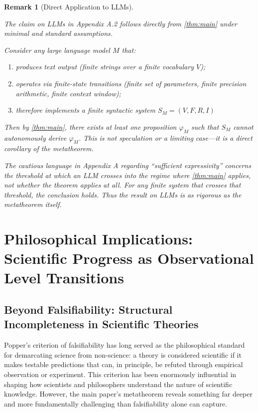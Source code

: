 \documentclass[11pt]{article}
\newtheorem{remark}[theorem]{Remark}
\begin{document}
\begin{remark}[Direct Application to LLMs]
    \label{rem:llm_direct}
    
    The claim on LLMs in Appendix A.2 follows directly from \ref{thm:main} 
    under minimal and standard assumptions. 
    
    Consider any large language model $M$ that:
    \begin{enumerate}
      \item produces text output (finite strings over a finite vocabulary $V$);
      \item operates via finite-state transitions (finite set of parameters, 
         finite precision arithmetic, finite context window);
      \item therefore implements a finite syntactic system $S_M = (V, F, R, I)$ 
    \end{enumerate}
    
    Then by \ref{thm:main}, there exists at least one proposition $\varphi_M$ 
    such that $S_M$ cannot autonomously derive $\varphi_M$. This is not speculation 
    or a limiting case---it is a direct corollary of the metatheorem.
    
    The cautious language in Appendix A regarding ``sufficient expressivity'' 
    concerns the \emph{threshold} at which an LLM crosses into the regime where 
    \ref{thm:main} applies, not whether the theorem applies at all. For any 
    finite system that crosses that threshold, the conclusion holds. Thus 
    the result on LLMs is as rigorous as the metatheorem itself.
    
\end{remark}


\section{Philosophical Implications: Scientific Progress as Observational Level Transitions}
\label{app:philosophy}

\subsection{Beyond Falsifiability: Structural Incompleteness in Scientific Theories}

Popper's criterion of falsifiability has long served as the philosophical standard for demarcating science from non-science: a theory is considered scientific if it makes testable predictions that can, in principle, be refuted through empirical observation or experiment. This criterion has been enormously influential in shaping how scientists and philosophers understand the nature of scientific knowledge. However, the main paper's metatheorem reveals something far deeper and more fundamentally challenging than falsifiability alone can capture.
\end{document}
